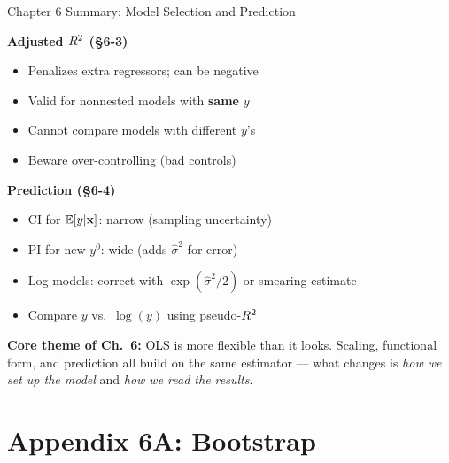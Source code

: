 \documentclass[aspectratio=169, 12pt]{beamer}
\begin{document}
\begin{frame}[shrink=8]{Chapter 6 Summary: Model Selection and Prediction}

      \begin{keybox}
        \textbf{Adjusted $R^2$ (\S6-3)}
        \begin{itemize}
          \item Penalizes extra regressors; can be negative
          \item Valid for nonnested models with \textbf{same} $y$
          \item Cannot compare models with different $y$'s
          \item Beware over-controlling (bad controls)
        \end{itemize}
      \end{keybox}
  \medskip

      \begin{keybox}
        \textbf{Prediction (\S6-4)}
        \begin{itemize}
          \item CI for $\operatorname{\mathbb{E}}[y|\mathbf{x}]$: narrow (sampling uncertainty)
          \item PI for new $y^0$: wide (adds $\hat\sigma^2$ for error)
          \item Log models: correct with $\exp(\hat\sigma^2/2)$
                or smearing estimate
          \item Compare $y$ vs.\ $\log(y)$ using pseudo-$R^2$
        \end{itemize}
      \end{keybox}

  \medskip

  \begin{highlightbox}
    \textbf{Core theme of Ch.\ 6:} OLS is more flexible than it looks.
    Scaling, functional form, and prediction all build on the same estimator ---
    what changes is \textit{how we set up the model} and \textit{how we read the results}.
  \end{highlightbox}

\end{frame}

\section*{Appendix 6A: Bootstrap}
\end{document}
